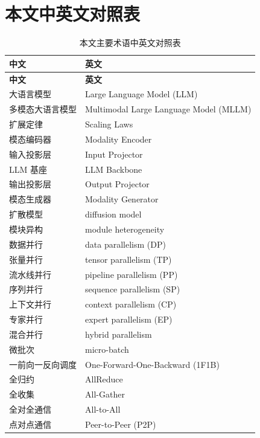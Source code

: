 \chapter*{本文中英文对照表}

\begingroup
\small
\setlength{\LTpre}{6pt}
\setlength{\LTpost}{6pt}
\renewcommand{\arraystretch}{1.12}
\begin{longtable}{@{}p{5.6cm}p{7.4cm}@{}}
	\caption{本文主要术语中英文对照表}\label{tab:appendix-bilingual} \\
	\toprule
	\textbf{中文} & \textbf{英文} \\
	\midrule
	\endfirsthead
	\toprule
	\textbf{中文} & \textbf{英文} \\
	\midrule
	\endhead
	\bottomrule
	\endlastfoot
	大语言模型 & Large Language Model (LLM) \\
	多模态大语言模型 & Multimodal Large Language Model (MLLM) \\
	扩展定律 & Scaling Laws \\
	模态编码器 & Modality Encoder \\
	输入投影层 & Input Projector \\
	LLM 基座 & LLM Backbone \\
	输出投影层 & Output Projector \\
	模态生成器 & Modality Generator \\
	扩散模型 & diffusion model \\
	模块异构 & module heterogeneity \\
	数据并行 & data parallelism (DP) \\
	张量并行 & tensor parallelism (TP) \\
	流水线并行 & pipeline parallelism (PP) \\
	序列并行 & sequence parallelism (SP) \\
	上下文并行 & context parallelism (CP) \\
	专家并行 & expert parallelism (EP) \\
	混合并行 & hybrid parallelism\\
	微批次 & micro-batch \\
	一前向一反向调度 & One-Forward-One-Backward (1F1B) \\
	全归约 & AllReduce \\
	全收集 & All-Gather \\
	全对全通信 & All-to-All \\
	点对点通信 & Peer-to-Peer (P2P) \\

\end{longtable}
